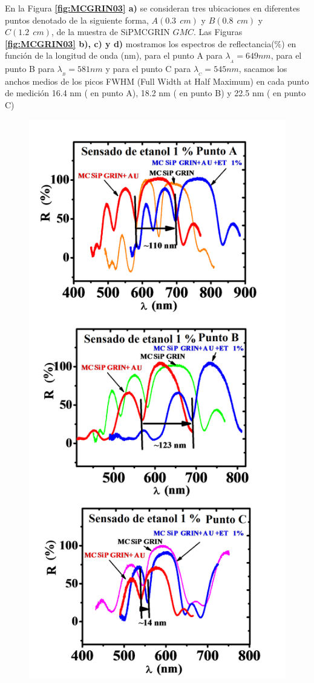 \documentclass[a4paper,11pt,]{book}
\begin{document}
En la Figura \textbf{\ref{fig:MCGRIN03} a)} se consideran tres ubicaciones en diferentes puntos denotado de la siguiente forma,  $A(0.3\ \ cm)$ y $ B(0.8 \ \  cm)$ y $ C(1.2 \ \  cm)$, de la  muestra de SiPMCGRIN $GMC$. Las Figuras \textbf{\ref{fig:MCGRIN03} b), c) y d)} mostramos los espectros de reflectancia($\%$) en función de la longitud de onda (nm), para el punto A para  $\lambda_{_{A}}=649 nm$, para el punto B para  $\lambda_{_{B}}=581 nm$ y para el punto C para  $\lambda_{_{C}}=545 nm$, sacamos  los anchos medios de los picos FWHM (Full Width at Half Maximum)\cite{FMHW1, FMHW2, FMHW3} en cada punto de medición  16.4 nm ( en punto A), 18.2 nm ( en punto B) y 22.5 nm ( en punto C)
\begin{figure}[H]
	\centering
	\includegraphics[scale=.18]{../Images/mcsensado}

\end{figure}
\end{document}
